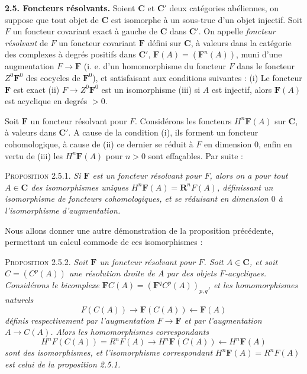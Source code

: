 
\textbf{2.5. Foncteurs résolvants.} 
Soient $\mathbf{C}$ et $\mathbf{C}'$ deux catégories abéliennes, on suppose que tout objet de
$\mathbf{C}$ est isomorphe à un sous-truc d'un objet injectif. Soit $F$ un foncteur
covariant exact à gauche de $\mathbf{C}$ dans $\mathbf{C}'$. On appelle \textit{foncteur
résolvant} de $F$ un foncteur covariant $\mathbf F$ défini sur $\mathbf{C}$, à valeurs
dans la catégorie des complexes à degrés positifs dans $\mathbf{C}'$,
$\mathbf F(A)=(\mathbf F^n(A))$, muni d'une augmentation
$F\to\mathbf F$ (i. e. d'un homomorphisme du foncteur $F$ dans
le foncteur $Z^0\mathbf F^0$ des cocycles de $\mathbf F^0$), et satisfaisant
aux conditions suivantes : (i) Le foncteur $\mathbf F$ est exact
(ii) $F\to Z^0\mathbf F^0$ est un isomorphisme (iii) si $A$ est
injectif, alors $\mathbf F(A)$ est acyclique en degrés $>0$.

Soit $\mathbf F$ un foncteur résolvant pour $F$. Considérons les foncteurs
$H^n\mathbf F(A)$ sur $\mathbf{C}$, à valeurs dans $\mathbf{C}'$. A cause de la condition (i),
ils forment un foncteur cohomologique, à cause de (ii) ce dernier se réduit à
$F$ en dimension 0, enfin en vertu de (iii) les $H^n\mathbf F(A)$ pour $n>0$
sont effaçables. Par suite :

\textsc{Proposition 2.5.1.} \textit{Si $\mathbf F$ est un
foncteur résolvant pour $F$, alors on a pour tout $A\in \mathbf{C}$ des isomorphismes
uniques $H^n\mathbf F(A)=\mathbf{R}^nF(A)$, définissant un isomorphisme de foncteurs
cohomologiques, et se réduisant en dimension $0$ à l'isomorphisme
d'augmentation.}

Nous allons donner une autre démonstration de la proposition précédente,
permettant un calcul commode de ces isomorphismes :

\textsc{Proposition 2.5.2.} \textit{Soit $\mathbf F$ un foncteur
résolvant pour $F$. Soit $A\in \mathbf{C}$, et soit $C=(C^p(A))$ une résolution droite
de $A$ par des objets $F$-acycliques. Considérons le bicomplexe
$\mathbf F C(A)=(\mathbf F^qC^p(A))_{p,q}$, et les homomorphismes naturels}
\[
\tag{2.5.1}
F(C(A))\to\mathbf F(C(A))\leftarrow\mathbf F(A)
\]
\textit{définis respectivement par l'augmentation
$F\to\mathbf F$ et par l'augmentation
$A\to C(A)$. Alors les homomorphismes correspondants}
\[
\tag{2.5.2}
H^nF(C(A))=R^nF(A)\to H^n\mathbf F(C(A))
\leftarrow H^n\mathbf F(A)
\]
\textit{sont des isomorphismes, et l'isomorphisme correspondant
$H^n\mathbf F(A)=R^nF(A)$ est celui de la proposition \textup{2.5.1.}}


